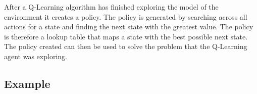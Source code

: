 After a Q-Learning algorithm has finished exploring the model of the environment it creates a policy. The policy is generated by searching across all actions for a state and finding the next state with the greatest value. The policy is therefore a lookup table that maps a state with the best possible next state. The policy created can then be used to solve the problem that the Q-Learning agent was exploring.~\cite{poole2010artificial}

\subsection{Example} \label{example}